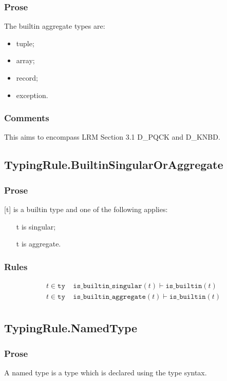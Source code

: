 \documentclass{book}
\begin{document}
    \subsubsection{Prose}
    The builtin aggregate types are:
    \begin{itemize}
    \item  tuple;
    \item  array;
    \item  record;
    \item  exception.
    \end{itemize}

    \subsubsection{Comments}
    This aims to encompass LRM Section 3.1 D\_PQCK and D\_KNBD.

\subsection{TypingRule.BuiltinSingularOrAggregate}

    \subsubsection{Prose}
    [t] is a builtin type and one of the following applies:
    \begin{itemize}
    \item  [t] is singular;
    \item  [t] is aggregate.
    \end{itemize}
    
   \subsubsection{Rules}
   \[
   \begin{array}{l}
   t \in \texttt{ty} \;\;\;\; \texttt{is\_builtin\_singular}(t) \vdash \texttt{is\_builtin}(t)\\
   t \in \texttt{ty} \;\;\;\; \texttt{is\_builtin\_aggregate}(t) \vdash \texttt{is\_builtin}(t)\\
   \end{array}
   \]
   

\subsection{TypingRule.NamedType} 

    \subsubsection{Prose}
    A named type is a type which is declared using the type syntax.
\end{document}
